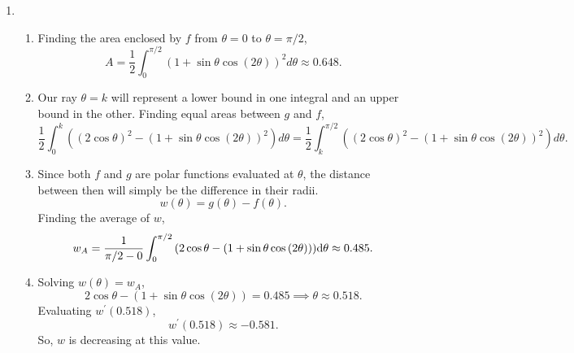 \begin{enumerate}
	\item \begin{enumerate}
		\item Finding the area enclosed by $f$ from $\theta=0$ to $\theta=\pi/2$,
			\begin{equation*}
				A = \frac{1}{2}\int_{0}^{\pi/2}{\left(1+\sin{\theta}\cos{(2\theta)}\right)^2d\theta} \approx 0.648.
			\end{equation*}
		\item Our ray $\theta=k$ will represent a lower bound in one integral and an upper bound in the other.
			Finding equal areas between $g$ and $f$,
			\begin{equation*}
				\frac{1}{2}\int_{0}^{k}{\left(\left(2\cos{\theta}\right)^2-\left(1+\sin{\theta}\cos{(2\theta)}\right)^2\right)d\theta} = \frac{1}{2}\int_{k}^{\pi/2}{\left(\left(2\cos{\theta}\right)^2-\left(1+\sin{\theta}\cos{(2\theta)}\right)^2\right)d\theta}.
			\end{equation*}
		\item
			Since both $f$ and $g$ are polar functions evaluated at $\theta$, the distance between then will simply be the difference in their radii.
			\begin{equation*}
				w(\theta) = g(\theta) - f(\theta).
			\end{equation*} 
			Finding the average of $w$,
			\begin{equation*}
				w_A = \frac{1}{\pi/2 - 0}\int_{0}^{\pi/2}{(2\cos{\theta}-(1+\sin{\theta}\cos{(2\theta)}))\mathrm{d} \theta} \approx 0.485.
			\end{equation*}
		\item Solving $w(\theta) = w_A$,
			\begin{equation*}
				2\cos{\theta}-(1+\sin{\theta}\cos{(2\theta)}) = 0.485 \implies \theta \approx 0.518.
			\end{equation*}
			Evaluating $w^\prime(0.518)$,
			\begin{equation*}
				w^\prime(0.518) \approx -0.581.
			\end{equation*}
			So, $w$ is decreasing at this value.
	\end{enumerate}


\end{enumerate}
